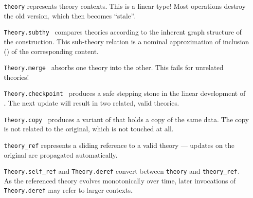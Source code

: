 \begin{isabellebody}
\begin{isamarkuptext}
  \begin{description}

  \item \verb|theory| represents theory contexts.  This is a
  linear type!  Most operations destroy the old version, which then
  becomes ``stale''.

  \item \verb|Theory.subthy|~
  compares theories according to the inherent graph structure of the
  construction.  This sub-theory relation is a nominal approximation
  of inclusion (\isa{{\isasymsubseteq}}) of the corresponding content.

  \item \verb|Theory.merge|~
  absorbs one theory into the other.  This fails for unrelated
  theories!

  \item \verb|Theory.checkpoint|~ produces a safe
  stepping stone in the linear development of .  The next
  update will result in two related, valid theories.

  \item \verb|Theory.copy|~ produces a variant of  that holds a copy of the same data.  The copy is not related
  to the original, which is not touched at all.

  \item \verb|theory_ref| represents a sliding reference to a
  valid theory --- updates on the original are propagated
  automatically.

  \item \verb|Theory.self_ref| and \verb|Theory.deref| convert
  between \verb|theory| and \verb|theory_ref|.  As the
  referenced theory evolves monotonically over time, later invocations
  of \verb|Theory.deref| may refer to larger contexts.

  \end{description}%
\end{isamarkuptext}%
\isamarkuptrue%
%
\endisatagmlref
{\isafoldmlref}%
%
\isadelimmlref
%
\endisadelimmlref
%
\isamarkuptrue%
%
\begin{isamarkuptext}%


\end{isamarkuptext}
\end{isabellebody}
